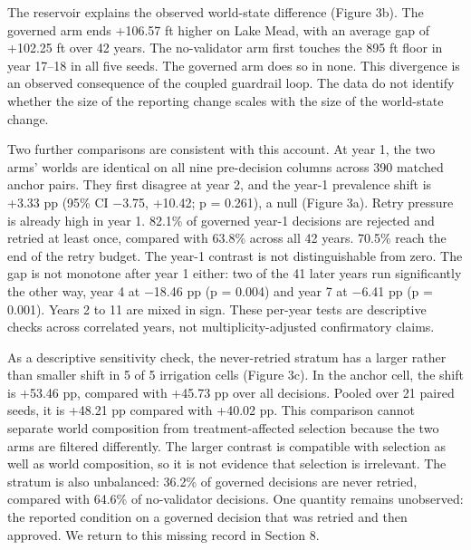 \documentclass{article}
\begin{document}
The reservoir explains the observed world-state difference (Figure 3b). The governed arm ends +106.57 ft higher on Lake Mead, with an average gap of +102.25 ft over 42 years. The no-validator arm first touches the 895 ft floor in year 17--18 in all five seeds. The governed arm does so in none. This divergence is an observed consequence of the coupled guardrail loop. The data do not identify whether the size of the reporting change scales with the size of the world-state change.

Two further comparisons are consistent with this account. At year 1, the two arms' worlds are identical on all nine pre-decision columns across 390 matched anchor pairs. They first disagree at year 2, and the year-1 prevalence shift is +3.33 pp (95\% CI $-$3.75, +10.42; p = 0.261), a null (Figure 3a). Retry pressure is already high in year 1. 82.1\% of governed year-1 decisions are rejected and retried at least once, compared with 63.8\% across all 42 years. 70.5\% reach the end of the retry budget. The year-1 contrast is not distinguishable from zero. The gap is not monotone after year 1 either: two of the 41 later years run significantly the other way, year 4 at $-$18.46 pp (p = 0.004) and year 7 at $-$6.41 pp (p = 0.001). Years 2 to 11 are mixed in sign. These per-year tests are descriptive checks across correlated years, not multiplicity-adjusted confirmatory claims.

As a descriptive sensitivity check, the never-retried stratum has a larger rather than smaller shift in 5 of 5 irrigation cells (Figure 3c). In the anchor cell, the shift is +53.46 pp, compared with +45.73 pp over all decisions. Pooled over 21 paired seeds, it is +48.21 pp compared with +40.02 pp. This comparison cannot separate world composition from treatment-affected selection because the two arms are filtered differently. The larger contrast is compatible with selection as well as world composition, so it is not evidence that selection is irrelevant. The stratum is also unbalanced: 36.2\% of governed decisions are never retried, compared with 64.6\% of no-validator decisions. One quantity remains unobserved: the reported condition on a governed decision that was retried and then approved. We return to this missing record in Section 8.
\end{document}
